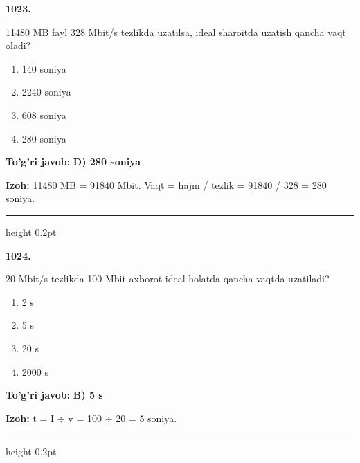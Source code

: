 \documentclass[10pt,a4paper,oneside]{article}
\begin{document}
\noindent\textbf{\color{ink}1023.}
\par
11480 MB fayl 328 Mbit/s tezlikda uzatilsa, ideal sharoitda uzatish qancha vaqt oladi?
\begin{enumerate}[label=\Alph*),leftmargin=9mm]
\item 140 soniya
\item 2240 soniya
\item 608 soniya
\item 280 soniya
\end{enumerate}
\begin{tcolorbox}[enhanced,breakable,colback=teal!4,colframe=teal!50!black,boxrule=0.5pt,arc=1.1mm,left=3mm,right=3mm,top=1.7mm,bottom=1.7mm,before skip=2mm,after skip=2mm]
\textbf{\color{teal}To'g'ri javob:} \textbf{D) 280 soniya}
\par\smallskip
\textbf{Izoh:} 11480 MB = 91840 Mbit. Vaqt = hajm / tezlik = 91840 / 328 = 280 soniya.
\end{tcolorbox}
\vspace{2mm}\hrule height 0.2pt \vspace{3mm}

\noindent\textbf{\color{ink}1024.}
\par
20 Mbit/s tezlikda 100 Mbit axborot ideal holatda qancha vaqtda uzatiladi?
\begin{enumerate}[label=\Alph*),leftmargin=9mm]
\item 2 s
\item 5 s
\item 20 s
\item 2000 s
\end{enumerate}
\begin{tcolorbox}[enhanced,breakable,colback=teal!4,colframe=teal!50!black,boxrule=0.5pt,arc=1.1mm,left=3mm,right=3mm,top=1.7mm,bottom=1.7mm,before skip=2mm,after skip=2mm]
\textbf{\color{teal}To'g'ri javob:} \textbf{B) 5 s}
\par\smallskip
\textbf{Izoh:} t = I \ensuremath{\div} v = 100 \ensuremath{\div} 20 = 5 soniya.
\end{tcolorbox}
\vspace{2mm}\hrule height 0.2pt \vspace{3mm}
\end{document}
